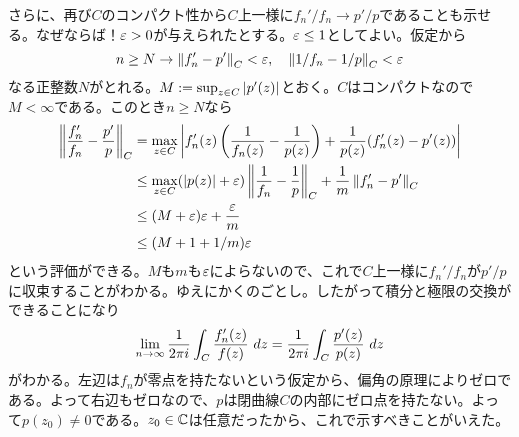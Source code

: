 \begin{sol}
  さらに、再び$C$のコンパクト性から$C$上一様に$f_n'/f_n \to p'/p$であることも示せる。なぜならば！${\varepsilon} > 0$が与えられたとする。${\varepsilon} \leq 1$としてよい。仮定から
  \[
  n \geq N \to \left \lVert f_n' - p' \right \rVert_C < {\varepsilon} , \quad \left \lVert 1/f_n - 1/p \right \rVert_C < {\varepsilon}
  \]
  なる正整数$N$がとれる。$M := \sup_{z \in C} \left \lvert p'(z) \right \rvert$とおく。$C$はコンパクトなので$M < \infty$である。このとき$n \geq N$なら
  \begin{align*}
    \left \lVert  \frac{f_n'}{f_n} - \frac{p'}{p}  \right \rVert_C &= \max_{z \in C} \left \lvert  f_n'(z) \left( \frac{1}{f_n(z)} - \frac{1}{p(z)} \right)   + \frac{1}{p(z)} ( f_n'(z) - p'(z) )   \right \rvert \\
    &\leq \max_{z \in C} (\left \lvert p(z)  \right \rvert + {\varepsilon} )  \left \lVert  \frac{1}{f_n} - \frac{1}{p}  \right \rVert_C + \frac{1}{m} \left \lVert f_n' - p' \right \rVert_C \\
    &\leq (M + {\varepsilon}){\varepsilon} + \frac{  {\varepsilon} }{ m} \\
    &\leq (M + 1 + 1/m){\varepsilon}
  \end{align*}
  という評価ができる。$M$も$m$も${\varepsilon}$によらないので、これで$C$上一様に$f_n'/f_n$が$p'/p$に収束することがわかる。ゆえにかくのごとし。したがって積分と極限の交換ができることになり
  \[
  \lim_{n \to \infty} \f{1}{2 \pi i} \int_C \f{f_n'(z)}{ f(z)} \ dz = \f{1}{2 \pi i} \int_C \f{p'(z)}{ p(z)} \ dz
  \]
  がわかる。左辺は$f_n$が零点を持たないという仮定から、偏角の原理によりゼロである。よって右辺もゼロなので、$p$は閉曲線$C$の内部にゼロ点を持たない。よって$p(z_0 ) \neq 0$である。$z_0 \in {\mathbb C}$は任意だったから、これで示すべきことがいえた。
\end{sol}
